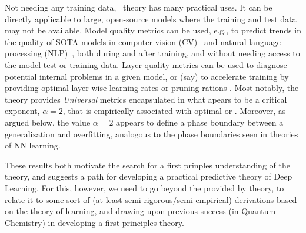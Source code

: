 Not needing any training data, \HTSR~theory has many practical uses.
It can be directly applicable to large, open-source  models where the training and test data may not be available.
Model quality metrics can be used, e.g., to predict trends in the quality of SOTA models in computer vision (CV)~\cite{MM20a_trends_NatComm} and natural language processing (NLP)~\cite{YTHx22_TR,YTHx23_KDD}, both during and after training, and without needing access to the model test or training data.
Layer quality metrics can be used to diagnose potential internal problems in a given model, or (say) to accelerate training by providing optimal layer-wise learning rates \cite{NEURIPS2023_CHM} or pruning rations \cite{alphapruning_NEURIPS2024}.
%
Most notably, the \HTSR theory provides \emph{Universal} \LayerQuality metrics encapsulated in what apears to be a critical exponent, $\alpha=2$, that is empirically associated with optimal or \IdealLearning. Moreover, as argued below, the
value $\alpha=2$ appears to define a phase boundary between a generalization and overfitting, analogous
to the phase boundaries seen in \STATMECH theories of NN learning. 

These results both motivate the search for a first prinples understanding of the \HTSR theory, 
and suggests a path for developing a practical predictive theory of Deep Learning.
For this, however, we need to go beyond the \Phenomenology provided by \HTSR theory, to relate it to some sort of (at least semi-rigorous/semi-empirical) derivations based on the \STATMECH theory of learning, and drawing
upon previous success (in Quantum Chemistry) in developing a first principles \SemiEmpirical theory. 

